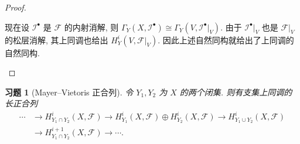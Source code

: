 \documentclass{article}
\theoremstyle{exercise}
\newtheorem{exercise}{习题}[section]
\theoremstyle{theorem}
\theoremstyle{remark}
\def\cF{\mathscr{F}}
\def\cI{\mathscr{I}}
\begin{document}
\begin{proof}
\begin{enumerate}[label=(\arabic*)]
          现在设 $\cI^\bullet$ 是 $\cF$ 的内射消解,
          则 $\Gamma_Y(X, \cI^\bullet) \cong \Gamma_Y(V, \cI^\bullet|_V)$.
          由于 $\cI^\bullet|_V$ 也是 $\cF|_V$ 的松层消解,
          其上同调也给出 $H_Y^i(V, \cF|_V)$. 因此上述自然同构就给出了上同调的自然同构.
          \qedhere
  \end{enumerate}
\end{proof}

\begin{exercise}[Mayer--Vietoris 正合列]
  令 $Y_1, Y_2$ 为 $X$ 的两个闭集. 则有支集上同调的长正合列
  \begin{align*}
    \cdots & \to H^i_{Y_1 \cap Y_2}(X, \cF)
              \to H^i_{Y_1}(X, \cF) \oplus H^i_{Y_2}(X, \cF)
              \to H^i_{Y_1 \cup Y_2}(X, \cF) \\
            & \to H^{i+1}_{Y_1 \cap Y_2}(X, \cF) \to \cdots.
  \end{align*}
\end{exercise}
\end{document}

